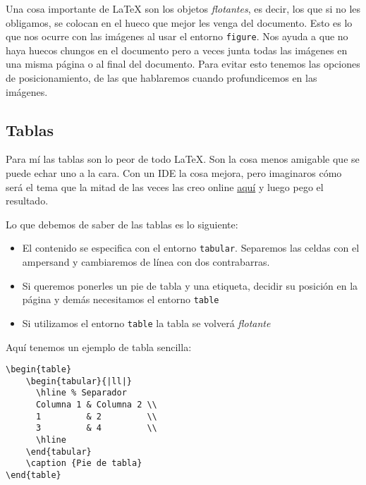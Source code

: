 Una cosa importante de LaTeX son los objetos \emph{flotantes}, es decir,
los que si no les obligamos, se colocan en el hueco que mejor les venga
del documento. Esto es lo que nos ocurre con las imágenes al usar el
entorno \lstinline!figure!. Nos ayuda a que no haya huecos chungos en el
documento pero a veces junta todas las imágenes en una misma página o al
final del documento. Para evitar esto tenemos las opciones de
posicionamiento, de las que hablaremos cuando profundicemos en las
imágenes.

\subsection{Tablas}\label{tablas}

Para mí las tablas son lo peor de todo LaTeX. Son la cosa menos amigable
que se puede echar uno a la cara. Con un IDE la cosa mejora, pero
imaginaros cómo será el tema que la mitad de las veces las creo online
\href{http://www.tablesgenerator.com/}{aquí} y luego pego el resultado.

Lo que debemos de saber de las tablas es lo siguiente:

\begin{itemize}
\item
  El contenido se especifica con el entorno \lstinline!tabular!.
  Separemos las celdas con el ampersand y cambiaremos de línea con dos
  contrabarras.
\item
  Si queremos ponerles un pie de tabla y una etiqueta, decidir su
  posición en la página y demás necesitamos el entorno \lstinline!table!
\item
  Si utilizamos el entorno \lstinline!table! la tabla se volverá
  \emph{flotante}
\end{itemize}

Aquí tenemos un ejemplo de tabla sencilla:

\begin{lstlisting}
\begin{table}
    \begin{tabular}{|ll|}
      \hline % Separador
      Columna 1 & Columna 2 \\
      1         & 2         \\
      3         & 4         \\
      \hline
    \end{tabular}
    \caption {Pie de tabla}
\end{table}
\end{lstlisting}

